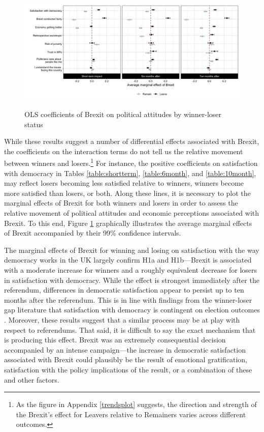 \documentclass[12pt, letter]{article}
\begin{document}
\begin{figure}[t]
\caption{OLS coefficients of Brexit on political attitudes by winner-loser status}
\hbox{\hspace{-0.5cm} \includegraphics[scale=0.16]{margeff_plot.png}}
\label{fig:marg}
\end{figure}

While these results suggest a number of differential effects associated with Brexit, the coefficients on the interaction terms do not tell us the relative movement between winners and losers.\footnote{As the figure in Appendix \ref{trendsplot} suggests, the direction and strength of the Brexit's effect for Leavers relative to Remainers varies across different outcomes.} For instance, the positive coefficients on satisfaction with democracy in Tables \ref{table:shortterm}, \ref{table:6month}, and \ref{table:10month}, may reflect losers becoming less satisfied relative to winners, winners become more satisfied than losers, or both. Along these lines, it is necessary to plot the marginal effects of Brexit for both winners and losers in order to assess the relative movement of political attitudes and economic perceptions associated with Brexit. To this end, Figure \ref{fig:marg} graphically illustrates the average marginal effects of Brexit accompanied by their 99\% confidence intervals. 



The marginal effects of Brexit for winning and losing on satisfaction with the way democracy works in the UK largely confirm H1a and H1b---Brexit is associated with a moderate increase for winners and a roughly equivalent decrease for losers in satisfaction with democracy. While the effect is strongest immediately after the referendum, differences in democratic satisfaction appear to persist up to ten months after the referendum. This is in line with findings from the winner-loser gap literature that satisfaction with democracy is contingent on election outcomes \parencite{anderson2002winning, anderson2005losers, blais2007winning, bowler2002democracy}. Moreover, these results suggest that a similar process may be at play with respect to referendums. That said, it is difficult to say the exact mechanism that is producing this effect. Brexit was an extremely consequential decision accompanied by an intense campaign---the increase in democratic satisfaction associated with Brexit could plausibly be the result of emotional gratification, satisfaction with the policy implications of the result, or a combination of these and other factors. 
\end{document}
